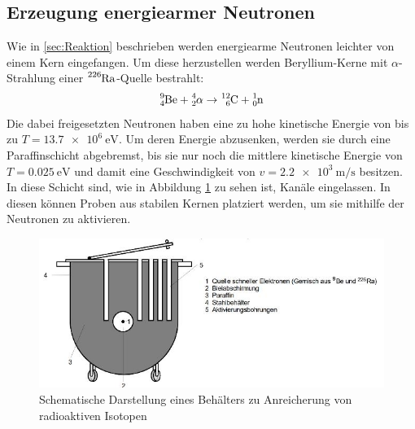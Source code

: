 \subsection{Erzeugung energiearmer Neutronen}

Wie in \ref{sec:Reaktion} beschrieben werden energiearme Neutronen leichter von einem Kern eingefangen. Um diese herzustellen werden Beryllium-Kerne mit $\alpha$-Strahlung einer $\ce{^{226}_{}Ra}$-Quelle bestrahlt:
\begin{equation}
\ce{^{9}_{4}Be} + \ce{^{4}_{2}\alpha}\rightarrow \ce{^{12}_{6}C}+\ce{^{1}_{0}n}
\end{equation}
Die dabei freigesetzten Neutronen haben eine zu hohe kinetische Energie von bis zu $T=\SI{13,7e6}{\electronvolt}$.
\noindent Um deren Energie abzusenken, werden sie durch eine Paraffinschicht abgebremst, bis sie nur noch die mittlere kinetische Energie von 
$T=\SI{0,025}{\electronvolt}$ und damit eine Geschwindigkeit von $v=\SI{2,2e3}{\metre\per\second}$ besitzen.
In diese Schicht sind, wie in Abbildung \ref{fig:ne} zu sehen ist, Kanäle
eingelassen. In diesen können Proben aus stabilen Kernen platziert werden, um sie mithilfe der Neutronen zu aktivieren.

\begin{figure}
\centering
\includegraphics[scale=0.5]{content/images/neutronen.jpg}
\caption{Schematische Darstellung eines Behälters zu Anreicherung von radioaktiven Isotopen\cite{V702}}
\label{fig:ne}
\end{figure}

